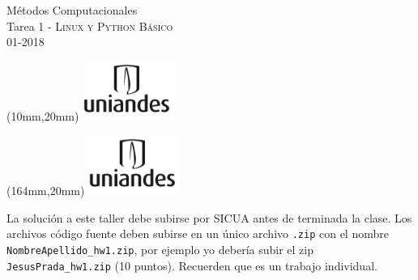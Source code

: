 \documentclass[11pt,letterpaper]{exam}
\begin{document}
\begin{center}
{\Large M\'etodos Computacionales} \\
Tarea 1 - \textsc{Linux y Python Básico}\\
01-2018\\
\end{center}

\begin{textblock*}{40mm}(10mm,20mm)
  \includegraphics[width=3cm]{logoUniandes}
\end{textblock*}

\begin{textblock*}{40mm}(164mm,20mm)
  \includegraphics[width=3cm]{logoUniandes}
\end{textblock*}

\vspace{0.3cm}

\noindent
La soluci\'on a este taller debe subirse por SICUA antes de terminada la clase.
\noindent
Los archivos c\'odigo fuente deben subirse en un \'unico archivo
\verb".zip" con el nombre \verb"NombreApellido_hw1.zip", por ejemplo
yo deber\'ia subir el zip \verb"JesusPrada_hw1.zip" (10 puntos). Recuerden que es un trabajo individual.

\vspace{0.3cm}
\end{document}

